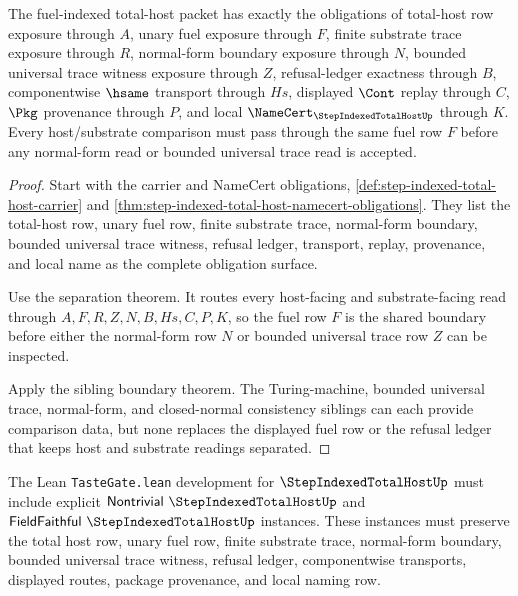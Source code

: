 \begin{theorem}
\label{thm:step-indexed-total-host-obligation-surface}
The fuel-indexed total-host packet has exactly the obligations of total-host row exposure through $A$, unary fuel exposure through $F$, finite substrate trace exposure through $R$, normal-form boundary exposure through $N$, bounded universal trace witness exposure through $Z$, refusal-ledger exactness through $B$, componentwise $\hsame$ transport through $Hs$, displayed $\Cont$ replay through $C$, $\Pkg$ provenance through $P$, and local $\NameCert_{\StepIndexedTotalHostUp}$ through $K$. Every host/substrate comparison must pass through the same fuel row $F$ before any normal-form read or bounded universal trace read is accepted.
\end{theorem}
\begin{proof}
Start with the carrier and NameCert obligations, \autoref{def:step-indexed-total-host-carrier} and \autoref{thm:step-indexed-total-host-namecert-obligations}. They list the total-host row, unary fuel row, finite substrate trace, normal-form boundary, bounded universal trace witness, refusal ledger, transport, replay, provenance, and local name as the complete obligation surface.

Use the separation theorem. It routes every host-facing and substrate-facing read through $A,F,R,Z,N,B,Hs,C,P,K$, so the fuel row $F$ is the shared boundary before either the normal-form row $N$ or bounded universal trace row $Z$ can be inspected.

Apply the sibling boundary theorem. The Turing-machine, bounded universal trace, normal-form, and closed-normal consistency siblings can each provide comparison data, but none replaces the displayed fuel row or the refusal ledger that keeps host and substrate readings separated.
\end{proof}

The Lean \texttt{TasteGate.lean} development for $\StepIndexedTotalHostUp$ must include explicit $\mathsf{Nontrivial}\ \StepIndexedTotalHostUp$ and $\mathsf{FieldFaithful}\ \StepIndexedTotalHostUp$ instances. These instances must preserve the total host row, unary fuel row, finite substrate trace, normal-form boundary, bounded universal trace witness, refusal ledger, componentwise transports, displayed routes, package provenance, and local naming row.

